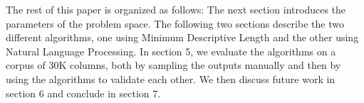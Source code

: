 The rest of this paper is organized as follows: The next section introduces the parameters of the problem space. The following two sections describe the two different algorithms, one using Minimum Descriptive Length and the other using Natural Language Processing. In section 5, we evaluate the algorithms on a corpus of 30K columns, both by sampling the outputs manually and then by using the algorithms to validate each other. We then discuss future work in section 6 and conclude in section 7.
